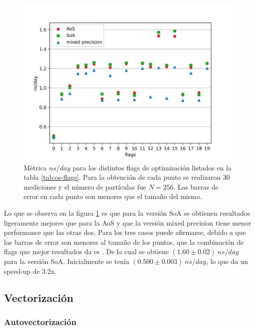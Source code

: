 \documentclass[a4paper,spanish,12pt,twoside]{article}
\begin{document}
\begin{figure}[h]
	\centering
	\includegraphics[width=.8\textwidth]{1-o_s-nsday.png}
	\caption{Métrica $ns/day$ para los distintos flags de optimización listados en la tabla \ref{tab:os-flags}. Para la obtención de cada punto se realizaron 30 mediciones y el número de partículas fue $N = 256$. Las barras de error en cada punto son menores que el tamaño del mismo.}
	\label{fig:os-nsday}
\end{figure}
Lo que se observa en la figura \ref{fig:os-nsday} es que para la versión SoA se obtienen resultados ligeramente mejores que para la AoS y que la versión mixed precision tiene menor performance que las otras dos. Para los tres casos puede afirmarse, debido a que las barras de error son menores al tamaño de los puntos, que la combinación de flags que mejor resultados da es . De la cual se obtiene $(1.60 \pm 0.02)\ ns/day$ para la versión SoA. Inicialmente se tenía $(0.500 \pm 0.003)\ ns/day$, lo que da un speed-up de 3.2x.



\subsection{Vectorización}

\subsubsection*{Autovectorización}
\end{document}
